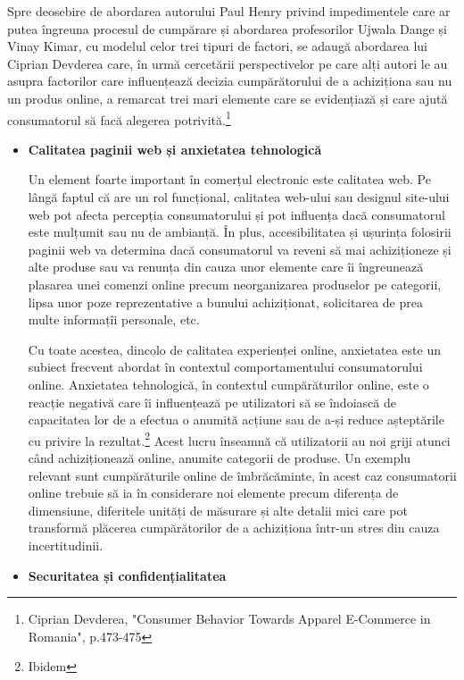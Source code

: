 \documentclass[a4paper, 12pt]{article}
\begin{document}
	\quad Spre deosebire de abordarea autorului Paul Henry privind impedimentele care ar putea îngreuna procesul de cumpărare și abordarea profesorilor Ujwala Dange și Vinay Kimar, cu modelul celor trei tipuri de factori, se adaugă abordarea lui Ciprian Devderea care, în urmă cercetării perspectivelor pe care alți autori le au asupra factorilor care influențează decizia cumpărătorului de a achiziționa sau nu un produs online, a remarcat trei mari elemente care se evidențiază și care ajută consumatorul să facă alegerea potrivită.\footnote{Ciprian Devderea, "Consumer Behavior Towards Apparel E-Commerce in Romania", p.473-475 }
	\begin{itemize}
		\item\textbf{Calitatea paginii web și anxietatea tehnologică} 
		
		\quad Un element foarte important în comerțul electronic este calitatea web. Pe lângă faptul că are un rol funcțional, calitatea web-ului sau designul site-ului web pot afecta percepția consumatorului și pot influența dacă consumatorul este mulțumit sau nu de ambianță. În plus, accesibilitatea și ușurința folosirii paginii web va determina dacă consumatorul va reveni să mai achiziționeze și alte produse sau va renunța din cauza unor elemente care îi îngreunează plasarea unei comenzi online precum neorganizarea produselor pe categorii, lipsa unor poze reprezentative a bunului achiziționat, solicitarea de prea multe informațîi personale, etc.
		
		\quad Cu toate acestea, dincolo de calitatea experienței online, anxietatea este un subiect frecvent abordat în contextul comportamentului consumatorului online. Anxietatea tehnologică, în contextul cumpărăturilor online, este o reacție negativă care îi influențează pe utilizatori să se îndoiască de capacitatea lor de a efectua o anumită acțiune sau de a-și reduce așteptările cu privire la rezultat.\footnote{Ibidem} Acest lucru înseamnă că utilizatorii au noi griji atunci când achiziționează online, anumite categorii de produse. Un exemplu relevant sunt cumpărăturile online de îmbrăcăminte, în acest caz consumatorii online trebuie să ia în considerare noi elemente precum diferența de dimensiune, diferitele unități de măsurare și alte detalii mici care pot transformă plăcerea cumpărătorilor de a achiziționa într-un stres din cauza incertitudinii.
		
		\item\textbf{Securitatea și confidențialitatea}
		

\end{itemize}
\end{document}
